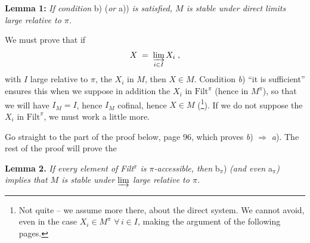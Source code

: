 \documentclass[11pt]{article}
\newcommand{\msp}[1]{\marginpar{\footnotesize [#1]}}
\newcommand{\Filt}{\mathrm{Filt}}
\begin{document}
\textbf{Lemma 1:} \textit{If condition} b) (\textit{or} a)) \textit{is satisfied, $M$ is stable under direct limits large relative to $\pi$.}

We must prove that if
\msp{page 90}
\[
X \;=\; \varinjlim_{i\in I} X_i \;,
\]
with $I$ large relative to $\pi$, the $X_i$ in $M$, then $X\in M$. Condition \textit{b}) ``it is sufficient'' ensures this when we suppose in addition the $X_i$ in $\Filt^\pi$ (hence in $M^\pi$), so that we will have $I_M=I$, hence $I_M$ cofinal, hence $X\in M$ (\footnote[42]{Not quite – we assume more there, about the direct system. We cannot avoid, even in the case $X_i\in M^\pi$ $\forall\, i\in I$, making the argument of the following pages.}). If we do not suppose the $X_i$ in $\Filt^\pi$, we must work a little more.

Go straight to the part of the proof below, page 96, which proves \textit{b}) $\Longrightarrow$ \textit{a}). The rest of the proof will prove the

\textbf{Lemma 2.} \textit{If every element of Filt$^\pi$ is $\pi$-accessible, then} b$_\pi$) \textit{(and even} a$_\pi$\textit{) implies that $M$ is stable under $\varinjlim$ large relative to $\pi$.}
\end{document}
